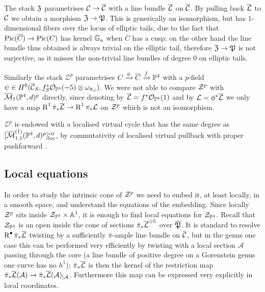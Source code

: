 \begin{rmk}\label{rmk:Zp}
The stack $\mathfrak Z$ parametrises $\mathcal{C}\rightarrow \overline{\mathcal{C}}$ with a line bundle $\overline{\mathcal{L}}$ on $\overline{\mathcal{C}}$. By pulling back $\overline{\mathcal{L}}$ to $\mathcal{C}$ we obtain a morphism $\mathfrak Z\rightarrow \mathfrak{P}$. This is generically an isomorphism, but has $1$-dimensional fibers over the locus of elliptic tails, due to the fact that $\operatorname{Pic}(\overline{C})\rightarrow\operatorname{Pic}(C)$ has kernel $\mathbb G_{\rm a}$ when $\overline{C}$ has a cusp; on the other hand the line bundle thus obtained is always trivial on the elliptic tail, therefore $\mathfrak Z\rightarrow \mathfrak{P}$ is not surjective, as it misses the non-trivial line bundles of degree $0$ on elliptic tails.

Similarly the stack $\mathcal Z^p$ parametrises $C\xrightarrow{\phi}\overline{C}\xrightarrow{\bar{f}} \mathbb P^4$ with a $p$-field $\psi\in H^0(\overline{\mathcal{C}}_S,f_S^*\mathcal{O}_{\mathbb P^4}(-5)\otimes\omega_{\bar\pi_S})$. We were not able to compare $\mathcal Z^p$ with $\overline{\mathcal{M}}_1(\mathbb P^4,d)^p$ directly, since denoting by $\overline{\mathcal{L}}=f^*\mathcal{O}_{\mathbb P^4}(1)$ and by $\mathcal L=\phi^*\overline{\mathcal{L}}$ we only have a map $\operatorname{R}^1\bar\pi_*\overline{\mathcal{L}}\rightarrow\operatorname{R}^1\pi_*\mathcal L$ on $\mathcal Z^p$ which is not an isomorphism.
\end{rmk}

$\mathcal Z^p$ is endowed with a localised virtual cycle that has the same degree as $[\overline{\mathcal M}^{(1)}_{1,1}(\mathbb P^4,d)^p]^{\rm{vir}}_{\rm{loc}}$, by commutativity of localised virtual pullback with proper pushforward \cite[Lemma 4.17]{BCM}.

\subsection{Local equations} In order to study the intrinsic cone of $\mathcal Z^p$ we need to embed it, at least locally, in a smooth space, and understand the equations of the embedding. Since locally $\mathcal Z^p$ sits inside $\mathcal Z_{\mathbb P^4}\times \mathbb{A}^1$, it is enough to find local equations for $\mathcal Z_{\mathbb P^4}$. Recall that $\mathcal Z_{\mathbb P^4}$ is an open inside the cone of sections $\bar{\pi}_*\overline{\mathcal{L}}^{\oplus 5}$ over $\overline{\mathfrak{P}}$. It is standard to resolve $\operatorname{R}^{\bullet}\bar{\pi}_*\overline{\mathcal{L}}$ twisting by a sufficiently $\bar{\pi}$-ample line bundle on $\overline{\mathcal{C}}$, but in the genus one case this can be performed very efficiently by twisting with a local section $\mathcal A$ passing through the core (a line bundle of positive degree on a Gorenstein genus one curve has no $h^1$); $\bar{\pi}_*\overline{\mathcal{L}}$ is then the kernel of the restriction map $\bar{\pi}_*\overline{\mathcal{L}}(\mathcal A)\rightarrow \bar{\pi}_*\overline{\mathcal{L}}(\mathcal A)_{|\mathcal A}$. Furthermore this map can be expressed very explicitly in local coordinates.

